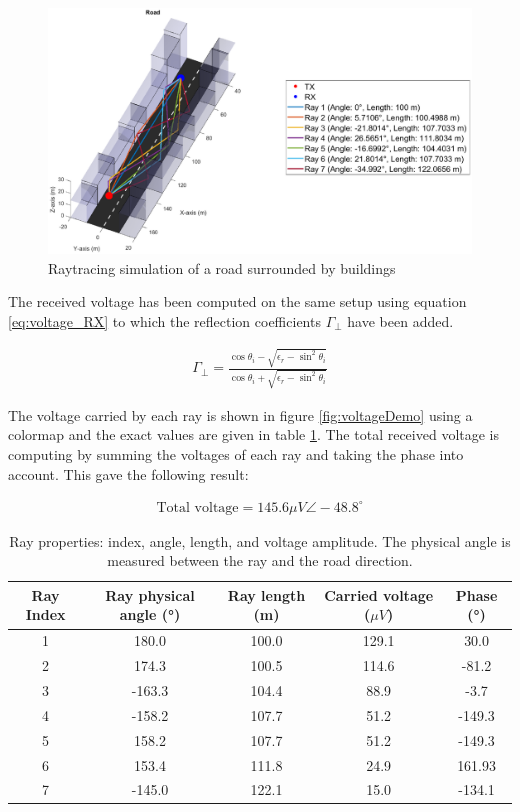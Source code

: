 \documentclass[10pt,a4paper]{ULBreport}
\begin{document}
\begin{figure}[H]
    \centering
    \includegraphics[width=1\textwidth]{3_1.eps}
    \caption{Raytracing simulation of a road surrounded by buildings}
    \label{fig:raytracingDemo}
\end{figure}

The received voltage has been computed on the same setup using equation \ref{eq:voltage_RX} to which the reflection coefficients $\Gamma_{\perp}$ have been added. 

\begin{align*}
    \Gamma_{\perp} = \frac{\cos \theta_i - \sqrt{\epsilon_r-\sin^2\theta_i}}{\cos \theta_i + \sqrt{\epsilon_r-\sin^2\theta_i}}
\end{align*}

The voltage carried by each ray is shown in figure \ref{fig:voltageDemo} using a colormap and the exact values are given in table \ref{tab:ray_properties}. The total received voltage is computing by summing the voltages of each ray and taking the phase into account. This gave the following result:

\begin{align*}
    \text{Total voltage} = 145.6 \mu V \angle -48.8^\circ
\end{align*}

\begin{table}[H]
    \centering
    \begin{tabular}{|c|c|c|c|c|}
        \hline
        Ray Index & Ray physical angle (°) & Ray length (m) & Carried voltage ($\mu V$) & Phase (°) \\ \hline
        1 & 180.0 & 100.0 & 129.1 & 30.0\\ \hline
        2 & 174.3 & 100.5 & 114.6 & -81.2\\ \hline
        3 & -163.3 & 104.4 & 88.9 & -3.7\\ \hline
        4 & -158.2 & 107.7 & 51.2 & -149.3\\ \hline
        5 & 158.2 & 107.7 & 51.2 & -149.3\\ \hline
        6 & 153.4 & 111.8 & 24.9 & 161.93\\ \hline
        7 & -145.0 & 122.1 & 15.0 & -134.1\\ \hline
    \end{tabular}
    \caption{Ray properties: index, angle, length, and voltage amplitude. The physical angle is measured between the ray and the road direction.}
    \label{tab:ray_properties}
\end{table}
\end{document}

